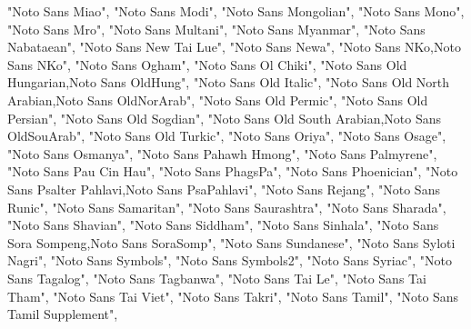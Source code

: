 \documentclass[
]{article}
\newenvironment{Shaded}{\begin{snugshade}}{\end{snugshade}}
\newcommand{\NormalTok}[1]{#1}
\newcommand{\StringTok}[1]{\textcolor[rgb]{0.31,0.60,0.02}{#1}}
\begin{document}
\begin{Shaded}
\begin{Highlighting}[]
  \StringTok{"Noto Sans Miao"}\NormalTok{,}
  \StringTok{"Noto Sans Modi"}\NormalTok{,}
  \StringTok{"Noto Sans Mongolian"}\NormalTok{,}
  \StringTok{"Noto Sans Mono"}\NormalTok{,}
  \StringTok{"Noto Sans Mro"}\NormalTok{,}
  \StringTok{"Noto Sans Multani"}\NormalTok{,}
  \StringTok{"Noto Sans Myanmar"}\NormalTok{,}
  \StringTok{"Noto Sans Nabataean"}\NormalTok{,}
  \StringTok{"Noto Sans New Tai Lue"}\NormalTok{,}
  \StringTok{"Noto Sans Newa"}\NormalTok{,}
  \StringTok{"Noto Sans NKo,Noto Sans N\textquotesingle{}Ko"}\NormalTok{,}
  \StringTok{"Noto Sans Ogham"}\NormalTok{,}
  \StringTok{"Noto Sans Ol Chiki"}\NormalTok{,}
  \StringTok{"Noto Sans Old Hungarian,Noto Sans OldHung"}\NormalTok{,}
  \StringTok{"Noto Sans Old Italic"}\NormalTok{,}
  \StringTok{"Noto Sans Old North Arabian,Noto Sans OldNorArab"}\NormalTok{,}
  \StringTok{"Noto Sans Old Permic"}\NormalTok{,}
  \StringTok{"Noto Sans Old Persian"}\NormalTok{,}
  \StringTok{"Noto Sans Old Sogdian"}\NormalTok{,}
  \StringTok{"Noto Sans Old South Arabian,Noto Sans OldSouArab"}\NormalTok{,}
  \StringTok{"Noto Sans Old Turkic"}\NormalTok{,}
  \StringTok{"Noto Sans Oriya"}\NormalTok{,}
  \StringTok{"Noto Sans Osage"}\NormalTok{,}
  \StringTok{"Noto Sans Osmanya"}\NormalTok{,}
  \StringTok{"Noto Sans Pahawh Hmong"}\NormalTok{,}
  \StringTok{"Noto Sans Palmyrene"}\NormalTok{,}
  \StringTok{"Noto Sans Pau Cin Hau"}\NormalTok{,}
  \StringTok{"Noto Sans PhagsPa"}\NormalTok{,}
  \StringTok{"Noto Sans Phoenician"}\NormalTok{,}
  \StringTok{"Noto Sans Psalter Pahlavi,Noto Sans PsaPahlavi"}\NormalTok{,}
  \StringTok{"Noto Sans Rejang"}\NormalTok{,}
  \StringTok{"Noto Sans Runic"}\NormalTok{,}
  \StringTok{"Noto Sans Samaritan"}\NormalTok{,}
  \StringTok{"Noto Sans Saurashtra"}\NormalTok{,}
  \StringTok{"Noto Sans Sharada"}\NormalTok{,}
  \StringTok{"Noto Sans Shavian"}\NormalTok{,}
  \StringTok{"Noto Sans Siddham"}\NormalTok{,}
  \StringTok{"Noto Sans Sinhala"}\NormalTok{,}
  \StringTok{"Noto Sans Sora Sompeng,Noto Sans SoraSomp"}\NormalTok{,}
  \StringTok{"Noto Sans Sundanese"}\NormalTok{,}
  \StringTok{"Noto Sans Syloti Nagri"}\NormalTok{,}
  \StringTok{"Noto Sans Symbols"}\NormalTok{,}
  \StringTok{"Noto Sans Symbols2"}\NormalTok{,}
  \StringTok{"Noto Sans Syriac"}\NormalTok{,}
  \StringTok{"Noto Sans Tagalog"}\NormalTok{,}
  \StringTok{"Noto Sans Tagbanwa"}\NormalTok{,}
  \StringTok{"Noto Sans Tai Le"}\NormalTok{,}
  \StringTok{"Noto Sans Tai Tham"}\NormalTok{,}
  \StringTok{"Noto Sans Tai Viet"}\NormalTok{,}
  \StringTok{"Noto Sans Takri"}\NormalTok{,}
  \StringTok{"Noto Sans Tamil"}\NormalTok{,}
  \StringTok{"Noto Sans Tamil Supplement"}\NormalTok{,}

\end{Highlighting}
\end{Shaded}
\end{document}
